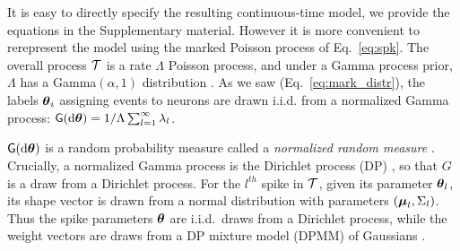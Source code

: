 % 
It is easy to directly specify the resulting continuous-time model, we provide the equations in the Supplementary material. 
However it is more convenient to rerepresent the model using the marked Poisson process of Eq.~\eqref{eq:spk}. %
The overall process $\mathcal{T}$ is a rate $\Lambda$ Poisson process,
and under a Gamma process prior, $\Lambda$ has a Gamma$(\alpha,1)$ distribution %
\citep{Ferguson73}.
As we saw (Eq.~\eqref{eq:mark_distr}), the labels $\boldsymbol{\theta}_i$ assigning events to neurons are drawn i.i.d. from a normalized Gamma 
process: %
$ \mathsf{G}(\mathrm{d} \boldsymbol{\theta}) = 1/\Lambda \sum_{l=1}^{\infty} \lambda_l$.

$\mathsf{G}(\mathrm{d} \boldsymbol{\theta})$ is a random probability measure called a \emph{normalized random measure} \citep{JamesLP09}. Crucially, a 
normalized Gamma process is the Dirichlet process (DP) \citep{Ferguson73}, so that $G$ is a draw from a Dirichlet process. For the $l^{th}$ spike in $\mathcal{T}$, given its 
parameter $\boldsymbol{\theta}_l$, its shape vector is drawn from a normal distribution
with parameters $(\boldsymbol{\mu}_{l}, \Sigma_{l})$. Thus the spike parameters $\boldsymbol{\theta}$ are i.i.d.\ draws from a Dirichlet process, while the weight vectors are
draws from a DP mixture model (DPMM) of Gaussians \citep{Lo1984}.

